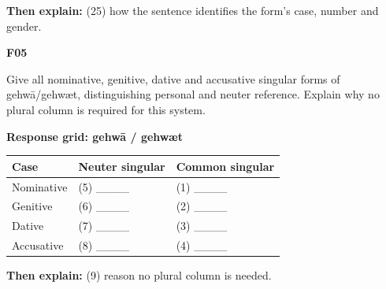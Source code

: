 \begin{minipage}{\linewidth}
\textbf{Then explain:} (25) how the sentence identifies the form’s case, number and gender.

\end{minipage}\par\addvspace{4pt}

\par\begin{minipage}{\linewidth}\raggedright
\textbf{F05}

Give all nominative, genitive, dative and accusative singular forms of gehwā/\allowbreak{}gehwæt, distinguishing personal and neuter reference. Explain why no plural column is required for this system.

\textbf{Response grid: gehwā /\allowbreak{} gehwæt}

\par\begingroup
\fontsize{10.5}{13.2}\selectfont
\setlength{\LTleft}{0pt}\setlength{\LTright}{\fill}
\noindent
\begin{tabular}{@{}>{\raggedright\arraybackslash}p{39.459mm}>{\raggedright\arraybackslash}p{39.459mm}>{\raggedright\arraybackslash}p{39.459mm}@{}}
\toprule
\textbf{Case} & \textbf{Neuter singular} & \textbf{Common singular} \\
\midrule
Nominative & (5) \_\_\_\_ & (1) \_\_\_\_ \\
Genitive & (6) \_\_\_\_ & (2) \_\_\_\_ \\
Dative & (7) \_\_\_\_ & (3) \_\_\_\_ \\
Accusative & (8) \_\_\_\_ & (4) \_\_\_\_ \\
\bottomrule
\end{tabular}
\par\endgroup
\textbf{Then explain:} (9) reason no plural column is needed.

\end{minipage}\par\addvspace{4pt}

